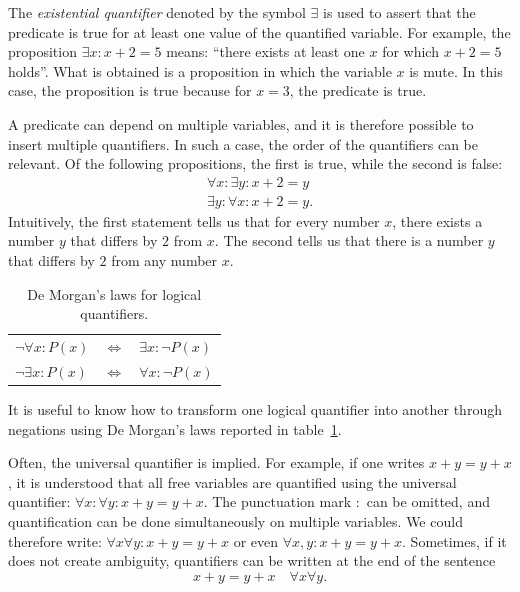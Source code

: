 The \emph{existential quantifier}%
%
 denoted by the symbol $\exists$ is used to assert that the predicate is true for at least one value of the quantified variable. For example, the proposition $\exists x\colon x+2=5$ means: ``there exists at least one $x$ for which $x+2=5$ holds''. What is obtained is a proposition in which the variable $x$ is mute. In this case, the proposition is true because for $x=3$, the predicate is true.

A predicate can depend on multiple variables, and it is therefore possible to
insert multiple quantifiers. In such a case, the order of the quantifiers can be
relevant. Of the following propositions, the first is true, while the second is
false:
\begin{gather*}
\forall x\colon \exists y\colon x+2=y \\
\exists y\colon \forall x\colon x+2=y.
\end{gather*}
Intuitively, the first statement tells us that for every number $x$, there
exists a number $y$ that differs by $2$ from $x$. The second tells us that there
is a number $y$ that differs by $2$ from any number $x$.

\begin{table}
  \begin{center}
    \begin{tabular}{lcl}
    $\lnot \forall x \colon P(x)$ & $\iff$ & $\exists x \colon \lnot P(x)$\\
    $\lnot \exists x \colon P(x)$ & $\iff$ & $\forall x \colon \lnot P(x)$\\
    \end{tabular}
  \end{center}
  \caption{De Morgan's laws for logical quantifiers.}
  \label{tab:proprieta_quantificatori}
\end{table}

It is useful to know how to transform one logical quantifier into another
through negations using De Morgan's laws reported in
table~\ref{tab:proprieta_quantificatori}.

Often, the universal quantifier is implied. For example, if one writes
$x+y=y+x$, it is understood that all free variables are quantified using the
universal quantifier: $\forall x\colon \forall y\colon x+y=y+x$. The punctuation
mark $\colon$ can be omitted, and quantification can be done simultaneously on
multiple variables. We could therefore write: $\forall x\forall y\colon x+y =
y+x$ or even $\forall x,y\colon x+y = y+x$. Sometimes, if it does not create
ambiguity, quantifiers can be written at the end of the sentence
\[
  x+y=y+x \quad \forall x\forall y.
\]

